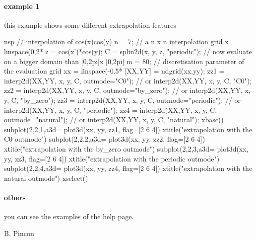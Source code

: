 
\begin{examples}

\paragraph{example 1} this example shows some different extrapolation features
\begin{mintednsp}{nsp}
// interpolation of cos(x)cos(y)
n = 7;  // a n x n interpolation grid
x = linspace(0,2*%
z = cos(x')*cos(y);
C = splin2d(x, y, z, "periodic");
// now evaluate on a bigger domain than [0,2pi]x [0,2pi]
m = 80; // discretisation parameter of the evaluation grid
xx = linspace(-0.5*%
[XX,YY] = ndgrid(xx,yy);
zz1 = interp2d(XX,YY, x, y, C, outmode="C0"); // or interp2d(XX,YY, x, y, C, "C0");
zz2 = interp2d(XX,YY, x, y, C, outmode="by_zero"); // or interp2d(XX,YY, x, y, C, "by_zero");
zz3 = interp2d(XX,YY, x, y, C, outmode="periodic"); // or interp2d(XX,YY, x, y, C, "periodic");
zz4 = interp2d(XX,YY, x, y, C, outmode="natural"); // or interp2d(XX,YY, x, y, C, "natural");
xbasc()
subplot(2,2,1,a3d=%
  plot3d(xx, yy, zz1, flag=[2 6 4])
  xtitle("extrapolation with the C0 outmode")
subplot(2,2,2,a3d=%
  plot3d(xx, yy, zz2, flag=[2 6 4])
  xtitle("extrapolation with the by_zero outmode")
subplot(2,2,3,a3d=%
  plot3d(xx, yy, zz3, flag=[2 6 4])
  xtitle("extrapolation with the periodic outmode")
subplot(2,2,4,a3d=%
  plot3d(xx, yy, zz4, flag=[2 6 4])
  xtitle("extrapolation with the natural outmode")
xselect()
\end{mintednsp}

\paragraph{others} you can see the examples of the
 help page.

\end{examples}

\begin{manseealso}
\end{manseealso}

\begin{authors}
B. Pincon
\end{authors}

